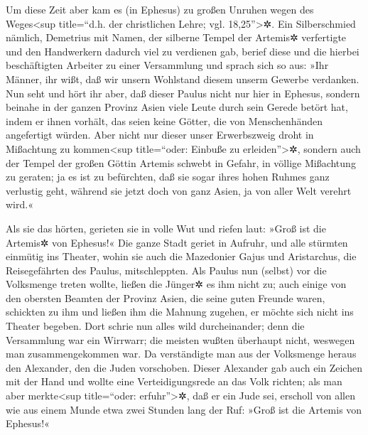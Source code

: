  Um diese Zeit aber kam es (in Ephesus) zu großen Unruhen
wegen des Weges\textless sup title=``d.h. der christlichen Lehre; vgl.
18,25''\textgreater✲.  Ein Silberschmied nämlich,
Demetrius mit Namen, der silberne Tempel der Artemis✲ verfertigte und
den Handwerkern dadurch viel zu verdienen gab,  berief
diese und die hierbei beschäftigten Arbeiter zu einer Versammlung und
sprach sich so aus: »Ihr Männer, ihr wißt, daß wir unsern Wohlstand
diesem unserm Gewerbe verdanken.  Nun seht und hört ihr
aber, daß dieser Paulus nicht nur hier in Ephesus, sondern beinahe in
der ganzen Provinz Asien viele Leute durch sein Gerede betört hat, indem
er ihnen vorhält, das seien keine Götter, die von Menschenhänden
angefertigt würden.  Aber nicht nur dieser unser
Erwerbszweig droht in Mißachtung zu kommen\textless sup title=``oder:
Einbuße zu erleiden''\textgreater✲, sondern auch der Tempel der großen
Göttin Artemis schwebt in Gefahr, in völlige Mißachtung zu geraten; ja
es ist zu befürchten, daß sie sogar ihres hohen Ruhmes ganz verlustig
geht, während sie jetzt doch von ganz Asien, ja von aller Welt verehrt
wird.«

 Als sie das hörten, gerieten sie in volle Wut und riefen
laut: »Groß ist die Artemis✲ von Ephesus!«  Die ganze
Stadt geriet in Aufruhr, und alle stürmten einmütig ins Theater, wohin
sie auch die Mazedonier Gajus und Aristarchus, die Reisegefährten des
Paulus, mitschleppten.  Als Paulus nun (selbst) vor die
Volksmenge treten wollte, ließen die Jünger✲ es ihm nicht zu;
 auch einige von den obersten Beamten der Provinz Asien,
die seine guten Freunde waren, schickten zu ihm und ließen ihm die
Mahnung zugehen, er möchte sich nicht ins Theater begeben.
 Dort schrie nun alles wild durcheinander; denn die
Versammlung war ein Wirrwarr; die meisten wußten überhaupt nicht,
weswegen man zusammengekommen war.  Da verständigte man
aus der Volksmenge heraus den Alexander, den die Juden vorschoben.
Dieser Alexander gab auch ein Zeichen mit der Hand und wollte eine
Verteidigungsrede an das Volk richten;  als man aber
merkte\textless sup title=``oder: erfuhr''\textgreater✲, daß er ein Jude
sei, erscholl von allen wie aus einem Munde etwa zwei Stunden lang der
Ruf: »Groß ist die Artemis von Ephesus!«

